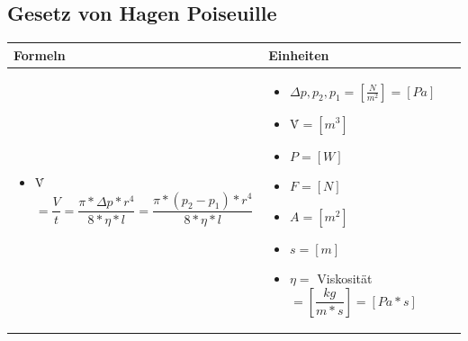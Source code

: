 \subsection{Gesetz von Hagen Poiseuille}				%
\begin{table}[h!]
	\begin{tabular}{ | m{9cm} | m{9cm}  | }
		\hline
		Formeln & Einheiten \\ \hline
		\midrule
		\begin{itemize}
			\item \.{V}$=\dfrac{V}{t}=\dfrac{\pi*\Delta p*r^{4}}{8*\eta*l}=\dfrac{\pi*(p_{2}-p_{1})*r^{4}}{8*\eta*l} $	
		\end{itemize}
		&
		\begin{itemize}
			\item $\Delta p,p_{2},p_{1}= [\frac{N}{m^{2}}]=[Pa]$
			\item \.{V}$=[m^3]$
			\item $P=[W]$
			\item $F=[N]$
			\item $A=[m^{2}]$
			\item $s=[m]$
			\item $\eta=$ Viskosität $=[\dfrac{kg}{m*s}]=[Pa*s]$
		\end{itemize}
		\\ \hline
	\end{tabular}
\end{table}

